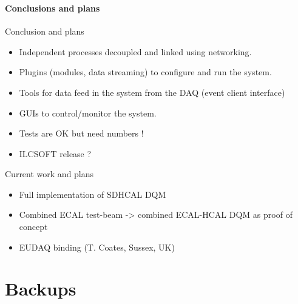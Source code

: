 \documentclass[8pt]{beamer}
\begin{document}
  \begin{frame}
  \frametitle{\secname}
  \framesubtitle{Conclusions and plans}

  \begin{block}{Conclusion and plans}
    \begin{itemize}
      \item Independent processes decoupled and linked using networking.
      \item Plugins (modules, data streaming) to configure and run the system.
      \item Tools for data feed in the system from the DAQ (event client interface)
      \item GUIs to control/monitor the system.
      \item Tests are OK but need numbers !
      \item ILCSOFT release ?
    \end{itemize}
  \end{block}
  
  \begin{block}{Current work and plans}
    \begin{itemize}
      \item Full implementation of SDHCAL DQM
      \item Combined ECAL test-beam -> combined ECAL-HCAL DQM as proof of concept
      \item EUDAQ binding (T. Coates, Sussex, UK)
    \end{itemize}
  \end{block}
  
  \end{frame}
  
  \section*{Backups}
  
\end{document}
